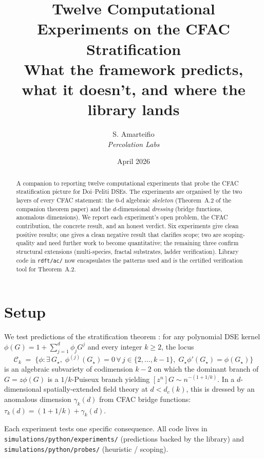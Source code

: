 \documentclass[11pt,a4paper]{article}
\title{Twelve Computational Experiments on the CFAC Stratification\\[4pt]
  \large What the framework predicts, what it doesn't, and where the library lands}
\author{S. Amarteifio\\
  \small\textit{Percolation Labs}}
\date{April 2026}
\theoremstyle{plain}
\newcommand{\Ck}{\mathcal{C}}
\begin{document}
\maketitle

\begin{abstract}
A companion to \citep{CFACtheorem,AmarteifioDSELandscape} reporting twelve
computational experiments that probe the CFAC stratification picture for
Doi--Peliti DSEs.  The experiments are organised by the two layers of every
CFAC statement: the $0$-d algebraic \emph{skeleton} (Theorem~A.2 of the
companion theorem paper) and the $d$-dimensional \emph{dressing} (bridge
functions, anomalous dimensions).  We report each experiment's open
problem, the CFAC contribution, the concrete result, and an honest
verdict.  Six experiments give clean positive results; one gives a clean
negative result that clarifies scope; two are scoping-quality and need
further work to become quantitative; the remaining three confirm
structural extensions (multi-species, fractal substrates, ladder
verification).  Library code in \texttt{rdft/ac/} now encapsulates the
patterns used and is the certified verification tool for Theorem~A.2.
\end{abstract}

\section{Setup}
\label{sec:setup}

We test predictions of the stratification theorem
\citep[Thm.~A.2]{CFACtheorem}: for any polynomial DSE kernel
$\phi(G) = 1 + \sum_{j=1}^{d}\phi_{j}G^{j}$ and every integer $k\geq 2$,
the locus
\[
  \Ck_{k}\;=\;\bigl\{\phi : \exists\,G_{\star},\;
    \phi^{(j)}(G_{\star}) = 0\,\forall\,j\in\{2,\ldots,k-1\},\;
    G_{\star}\phi'(G_{\star}) = \phi(G_{\star})\bigr\}
\]
is an algebraic subvariety of codimension $k-2$ on which the dominant
branch of $G = z\phi(G)$ is a $1/k$-Puiseux branch yielding
$[z^{n}]G \sim n^{-(1+1/k)}$.  In a $d$-dimensional spatially-extended
field theory at $d < d_{c}(k)$, this is dressed by an anomalous dimension
$\gamma_{k}(d)$ from CFAC bridge functions:
$\tau_{k}(d) = (1+1/k) + \gamma_{k}(d)$.

Each experiment tests one specific consequence.  All code lives in
\texttt{simulations/python/experiments/} (predictions backed by the
library) and \texttt{simulations/python/probes/} (heuristic / scoping).
\end{document}
